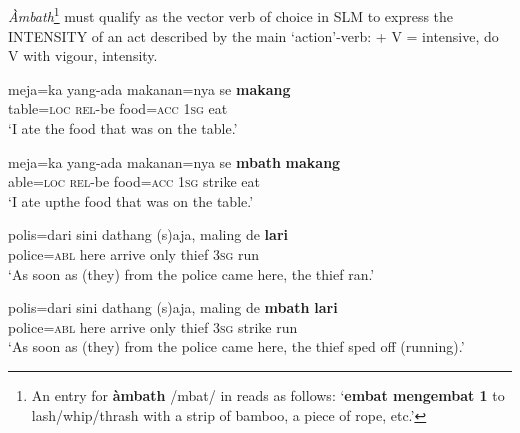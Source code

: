 \subsection{}
{\em Àmbath}\footnote{An
 entry for \textbf{àmbath} /{\E}mbat/ in \citet{StevensEtAl2004} reads as follows: `\textbf{embat mengembat 1} to lash/whip/thrash with a strip of bamboo, a piece of rope, etc.'
}
must qualify as the vector verb of choice in SLM to express the INTENSITY of an act described by the main `action'{}-verb:
 + V = intensive, do V with vigour, intensity.

\ea\label{jaffar:ex:23}
\gll meja=ka yang-ada makanan=nya se \textbf{makang} \\
 table=\textsc{loc}  \textsc{rel}-be food=\textsc{acc}  1\textsc{sg} eat\\
`I ate the food that was on the table.'
\z


\ea\label{jaffar:ex:24}
\gll meja=ka yang-ada makanan=nya se \textbf{mbath} \textbf{makang} \footnotemark \\
 able=\textsc{loc}  \textsc{rel}-be food=\textsc{acc}  1\textsc{sg} strike eat\\
 `I ate up\footnotemark the food that was on the table.'
\z
{}

\ea\label{jaffar:ex:25}
\gll polis=dari sini dathang (s)aja, maling de \textbf{lari} \\
 police=\textsc{abl}  here arrive only thief 3\textsc{sg} run\\
`As soon as (they) from the police came here, the thief ran.'
\z

\ea\label{jaffar:ex:26}
\gll polis=dari sini dathang (s)aja, maling de \textbf{mbath} \textbf{lari} \\
 police=\textsc{abl}  here arrive only thief 3\textsc{sg} strike run\\
 `As soon as (they) from the police came here, the thief sped off (running).'
\z

